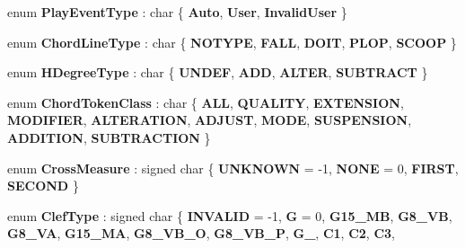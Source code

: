 \begin{DoxyCompactItemize}
enum {\bfseries Play\+Event\+Type} \+: char \{ {\bfseries Auto}, 
{\bfseries User}, 
{\bfseries Invalid\+User}
 \}
\item 
\mbox{\label{namespace_ms_a9ccb3e9df2da4c9cce7b4508d39b22f8}} 
enum {\bfseries Chord\+Line\+Type} \+: char \{ \newline
{\bfseries N\+O\+T\+Y\+PE}, 
{\bfseries F\+A\+LL}, 
{\bfseries D\+O\+IT}, 
{\bfseries P\+L\+OP}, 
\newline
{\bfseries S\+C\+O\+OP}
 \}
\item 
\mbox{\label{namespace_ms_a401306c67aaadf0a4102c60331e324d6}} 
enum {\bfseries H\+Degree\+Type} \+: char \{ {\bfseries U\+N\+D\+EF}, 
{\bfseries A\+DD}, 
{\bfseries A\+L\+T\+ER}, 
{\bfseries S\+U\+B\+T\+R\+A\+CT}
 \}
\item 
\mbox{\label{namespace_ms_a161dff7089bf7aa507d8e02de7c64570}} 
enum {\bfseries Chord\+Token\+Class} \+: char \{ \newline
{\bfseries A\+LL}, 
{\bfseries Q\+U\+A\+L\+I\+TY}, 
{\bfseries E\+X\+T\+E\+N\+S\+I\+ON}, 
{\bfseries M\+O\+D\+I\+F\+I\+ER}, 
\newline
{\bfseries A\+L\+T\+E\+R\+A\+T\+I\+ON}, 
{\bfseries A\+D\+J\+U\+ST}, 
{\bfseries M\+O\+DE}, 
{\bfseries S\+U\+S\+P\+E\+N\+S\+I\+ON}, 
\newline
{\bfseries A\+D\+D\+I\+T\+I\+ON}, 
{\bfseries S\+U\+B\+T\+R\+A\+C\+T\+I\+ON}
 \}
\item 
\mbox{\label{namespace_ms_a1d19008c03cb6d496010a5451a9a5e71}} 
enum {\bfseries Cross\+Measure} \+: signed char \{ {\bfseries U\+N\+K\+N\+O\+WN} = -\/1, 
{\bfseries N\+O\+NE} = 0, 
{\bfseries F\+I\+R\+ST}, 
{\bfseries S\+E\+C\+O\+ND}
 \}
\item 
\mbox{\label{namespace_ms_a3b085ddb3e3b890843f2e33874b9fa4b}} 
enum {\bfseries Clef\+Type} \+: signed char \{ \newline
{\bfseries I\+N\+V\+A\+L\+ID} = -\/1, 
{\bfseries G} = 0, 
{\bfseries G15\+\_\+\+MB}, 
{\bfseries G8\+\_\+\+VB}, 
\newline
{\bfseries G8\+\_\+\+VA}, 
{\bfseries G15\+\_\+\+MA}, 
{\bfseries G8\+\_\+\+V\+B\+\_\+O}, 
{\bfseries G8\+\_\+\+V\+B\+\_\+P}, 
\newline
{\bfseries G\+\_}, 
{\bfseries C1}, 
{\bfseries C2}, 
{\bfseries C3}, 

\end{DoxyCompactItemize}
